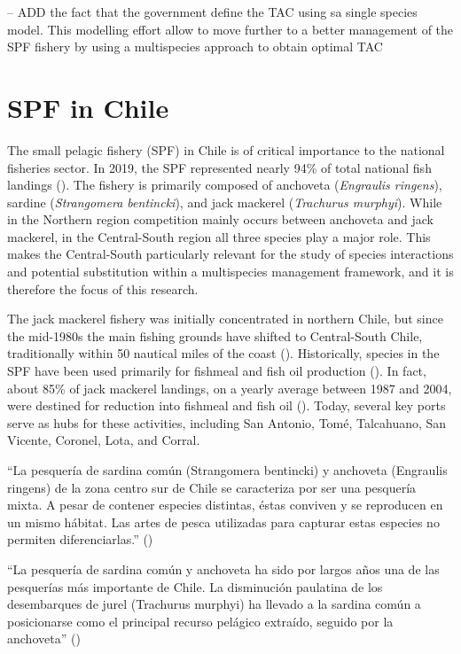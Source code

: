 \documentclass[
  11pt,
]{article}
\begin{document}
-- ADD the fact that the government define the TAC using sa single
species model. This modelling effort allow to move further to a better
management of the SPF fishery by using a multispecies approach to obtain
optimal TAC

\section{SPF in Chile}\label{spf-in-chile}

The small pelagic fishery (SPF) in Chile is of critical importance to
the national fisheries sector. In 2019, the SPF represented nearly 94\%
of total national fish landings (). The fishery is
primarily composed of anchoveta (\emph{Engraulis ringens}), sardine
(\emph{Strangomera bentincki}), and jack mackerel (\emph{Trachurus murphyi}).
While in the Northern region competition mainly occurs between anchoveta
and jack mackerel, in the Central-South region all three species play a
major role. This makes the Central-South particularly relevant for the
study of species interactions and potential substitution within a
multispecies management framework, and it is therefore the focus of this
research.

The jack mackerel fishery was initially concentrated in northern Chile,
but since the mid-1980s the main fishing grounds have shifted to
Central-South Chile, traditionally within 50 nautical miles of the coast
(). Historically, species in the SPF have been used
primarily for fishmeal and fish oil production (). In
fact, about 85\% of jack mackerel landings, on a yearly average between
1987 and 2004, were destined for reduction into fishmeal and fish oil
(). Today, several key ports serve as hubs for these
activities, including San Antonio, Tomé, Talcahuano, San Vicente,
Coronel, Lota, and Corral.

``La pesquería de sardina común (Strangomera bentincki) y anchoveta (Engraulis ringens)
de la zona centro sur de Chile se caracteriza por ser una pesquería mixta. A pesar de contener
especies distintas, éstas conviven y se reproducen en un mismo hábitat. Las artes de pesca
utilizadas para capturar estas especies no permiten diferenciarlas.'' ()

``La pesquería de sardina común y anchoveta ha sido por largos años una de las pesquerías
más importante de Chile. La disminución paulatina de los desembarques de jurel (Trachurus
murphyi) ha llevado a la sardina común a posicionarse como el principal recurso pelágico
extraído, seguido por la anchoveta'' ()
\end{document}
